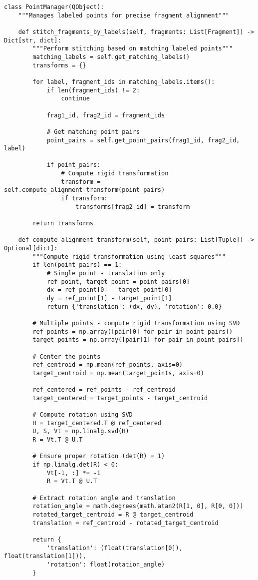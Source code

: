 \documentclass[12pt,a4paper]{report}
\begin{document}
\begin{lstlisting}[caption=Gestion des points étiquetés]
class PointManager(QObject):
    """Manages labeled points for precise fragment alignment"""
    
    def stitch_fragments_by_labels(self, fragments: List[Fragment]) -> Dict[str, dict]:
        """Perform stitching based on matching labeled points"""
        matching_labels = self.get_matching_labels()
        transforms = {}
        
        for label, fragment_ids in matching_labels.items():
            if len(fragment_ids) != 2:
                continue
                
            frag1_id, frag2_id = fragment_ids
            
            # Get matching point pairs
            point_pairs = self.get_point_pairs(frag1_id, frag2_id, label)
            
            if point_pairs:
                # Compute rigid transformation
                transform = self.compute_alignment_transform(point_pairs)
                if transform:
                    transforms[frag2_id] = transform
        
        return transforms
    
    def compute_alignment_transform(self, point_pairs: List[Tuple]) -> Optional[dict]:
        """Compute rigid transformation using least squares"""
        if len(point_pairs) == 1:
            # Single point - translation only
            ref_point, target_point = point_pairs[0]
            dx = ref_point[0] - target_point[0]
            dy = ref_point[1] - target_point[1]
            return {'translation': (dx, dy), 'rotation': 0.0}
        
        # Multiple points - compute rigid transformation using SVD
        ref_points = np.array([pair[0] for pair in point_pairs])
        target_points = np.array([pair[1] for pair in point_pairs])
        
        # Center the points
        ref_centroid = np.mean(ref_points, axis=0)
        target_centroid = np.mean(target_points, axis=0)
        
        ref_centered = ref_points - ref_centroid
        target_centered = target_points - target_centroid
        
        # Compute rotation using SVD
        H = target_centered.T @ ref_centered
        U, S, Vt = np.linalg.svd(H)
        R = Vt.T @ U.T
        
        # Ensure proper rotation (det(R) = 1)
        if np.linalg.det(R) < 0:
            Vt[-1, :] *= -1
            R = Vt.T @ U.T
        
        # Extract rotation angle and translation
        rotation_angle = math.degrees(math.atan2(R[1, 0], R[0, 0]))
        rotated_target_centroid = R @ target_centroid
        translation = ref_centroid - rotated_target_centroid
        
        return {
            'translation': (float(translation[0]), float(translation[1])),
            'rotation': float(rotation_angle)
        }
\end{lstlisting}
\end{document}
